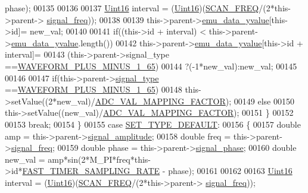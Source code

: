 \begin{DoxyCode}
      phase);
00135 
00136 
00137         \hyperlink{a00001_aae7407b021d43f7193a81a58cfb3e297}{Uint16} interval = (\hyperlink{a00001_aae7407b021d43f7193a81a58cfb3e297}{Uint16})(\hyperlink{a00031_a8127170b687c1f67a968886c128e76e4}{SCAN\_FREQ}/(2*this->parent->
      \hyperlink{a00004_a67039999d520fc483fab521fae5ddde4}{signal\_freq}));
00138 
00139         this->parent->\hyperlink{a00004_ad922d05d1e988d84f404c115fe909f72}{emu\_data\_yvalue}[this->id]= new\_val;
00140 
00141        \textcolor{keywordflow}{if}((this->\textcolor{keywordtype}{id} + interval) < this->parent->\hyperlink{a00004_ad922d05d1e988d84f404c115fe909f72}{emu\_data\_yvalue}.length())
00142         this->parent->\hyperlink{a00004_ad922d05d1e988d84f404c115fe909f72}{emu\_data\_yvalue}[this->id + interval]=
00143         (this->parent->signal\_type ==\hyperlink{a00034_a0923d3b365a36e1e8c401cec964aa36f}{WAVEFORM\_PLUS\_MINUS\_1\_65})
00144         ?(-1*new\_val):new\_val;
00145 
00146 
00147         \textcolor{keywordflow}{if}(this->parent->\hyperlink{a00004_a070edaec5aee6ba1f5a6866bc32c8ce4}{signal\_type} ==\hyperlink{a00034_a0923d3b365a36e1e8c401cec964aa36f}{WAVEFORM\_PLUS\_MINUS\_1\_65})
00148         this->setValue((2*new\_val)/\hyperlink{a00031_ada92d3eeeec0cbeee41e76a52d145792}{ADC\_VAL\_MAPPING\_FACTOR});
00149         \textcolor{keywordflow}{else}
00150         this->setValue((new\_val)/\hyperlink{a00031_ada92d3eeeec0cbeee41e76a52d145792}{ADC\_VAL\_MAPPING\_FACTOR});
00151         \}
00152 
00153     \textcolor{keywordflow}{break};
00154      \}
00155     \textcolor{keywordflow}{case} \hyperlink{a00034_afd1036bf6329d2ac31913e14c1f56725}{SET\_TYPE\_DEFAULT}:
00156     \{
00157         \textcolor{keywordtype}{double} amp     = this->parent->\hyperlink{a00004_a73dabe63bd74afe2776e8136211dc36e}{signal\_amplitude};
00158         \textcolor{keywordtype}{double} freq    = this->parent->\hyperlink{a00004_a67039999d520fc483fab521fae5ddde4}{signal\_freq};
00159         \textcolor{keywordtype}{double} phase   = this->parent->\hyperlink{a00004_af08de88fdfe283086e3cca97a2965678}{signal\_phase};
00160         \textcolor{keywordtype}{double} new\_val = amp*sin(2*M\_PI*freq*this->\textcolor{keywordtype}{id}*\hyperlink{a00031_a3a4dcb8af26a561d90607a41a3745806}{FAST\_TIMER\_SAMPLING\_RATE} - 
      phase);
00161 
00162 
00163         \hyperlink{a00001_aae7407b021d43f7193a81a58cfb3e297}{Uint16} interval = (\hyperlink{a00001_aae7407b021d43f7193a81a58cfb3e297}{Uint16})(\hyperlink{a00031_a8127170b687c1f67a968886c128e76e4}{SCAN\_FREQ}/(2*this->parent->
      \hyperlink{a00004_a67039999d520fc483fab521fae5ddde4}{signal\_freq}));

\end{DoxyCode}
